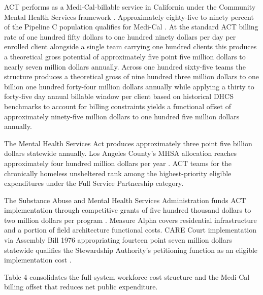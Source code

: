 \documentclass[12pt, letterpaper]{article}
\begin{document}
ACT performs as a Medi-Cal-billable service in California under the Community Mental Health Services framework \citep{medi_cal_act_2024}. Approximately eighty-five to ninety percent of the Pipeline C population qualifies for Medi-Cal \citep{ucsf_bhhi_2023}. At the standard ACT billing rate of one hundred fifty dollars to one hundred ninety dollars per day per enrolled client alongside a single team carrying one hundred clients this produces a theoretical gross potential of approximately five point five million dollars to nearly seven million dollars annually. Across one hundred sixty-five teams the structure produces a theoretical gross of nine hundred three million dollars to one billion one hundred forty-four million dollars annually while applying a thirty to forty-five day annual billable window per client based on historical DHCS benchmarks to account for billing constraints \citep{dhcs_act_utilization_2024} yields a functional offset of approximately ninety-five million dollars to one hundred five million dollars annually.

The Mental Health Services Act produces approximately three point five billion dollars statewide annually. Los Angeles County's MHSA allocation reaches approximately four hundred million dollars per year \citep{mhsa_2024}. ACT teams for the chronically homeless unsheltered rank among the highest-priority eligible expenditures under the Full Service Partnership category.

The Substance Abuse and Mental Health Services Administration funds ACT implementation through competitive grants of five hundred thousand dollars to two million dollars per program \citep{samhsa_act_2024}. Measure Alpha covers residential infrastructure and a portion of field architecture functional costs. CARE Court implementation via Assembly Bill 1976 appropriating fourteen point seven million dollars statewide qualifies the Stewardship Authority's petitioning function as an eligible implementation cost \citep{ab_1976_2024}.

\clearpage

Table 4 consolidates the full-system workforce cost structure and the Medi-Cal billing offset that reduces net public expenditure.
\end{document}
